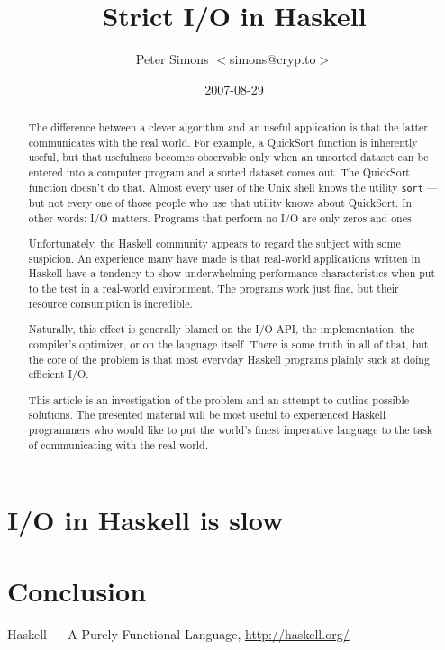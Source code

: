 \documentclass[abstracton,a4paper,twocolumn,9pt]{scrartcl}
\def\LASTCHANGED{2007-08-29}    %
\newcommand{\tool}[1]{\texttt{#1}}
\begin{document}
\title{Strict I/O in Haskell}
\author{Peter Simons $<$simons@cryp.to$>$}
\date{\LASTCHANGED}
\maketitle

\begin{abstract}
  The difference between a clever algorithm and an useful application is
  that the latter communicates with the real world. For example, a
  QuickSort function is inherently useful, but that usefulness becomes
  observable only when an unsorted dataset can be entered into a
  computer program and a sorted dataset comes out. The QuickSort
  function doesn't do that. Almost every user of the Unix shell knows
  the utility \tool{sort} --- but not every one of those people who use
  that utility knows about QuickSort. In other words: I/O matters.
  Programs that perform no I/O are only zeros and ones.

  Unfortunately, the Haskell community appears to regard the subject
  with some suspicion. An experience many have made is that real-world
  applications written in Haskell have a tendency to show underwhelming
  performance characteristics when put to the test in a real-world
  environment. The programs work just fine, but their resource
  consumption is incredible.

  Naturally, this effect is generally blamed on the I/O API, the
  implementation, the compiler's optimizer, or on the language itself.
  There is some truth in all of that, but the core of the problem is
  that most everyday Haskell programs plainly suck at doing efficient
  I/O.

  This article is an investigation of the problem and an attempt to
  outline possible solutions. The presented material will be most useful
  to experienced Haskell programmers who would like to put the world's
  finest imperative language to the task of communicating with the real
  world.
\end{abstract}

\section{I/O in Haskell is slow} %

  




\section{Conclusion} %

\begin{thebibliography}{9}
      Haskell --- A Purely Functional Language,
      \url{http://haskell.org/}

\end{thebibliography}
\end{document}
